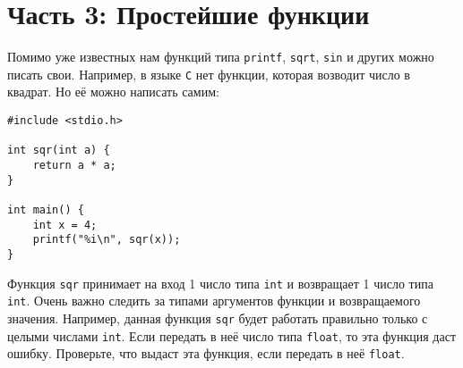 \documentclass{article}
\begin{document}

\section*{Часть 3: Простейшие функции}
Помимо уже известных нам функций типа \texttt{printf}, \texttt{sqrt}, \texttt{sin} и других можно писать свои. Например, в языке \texttt{C} нет функции, которая возводит число в квадрат. Но её можно написать самим:
\begin{lstlisting}
#include <stdio.h>

int sqr(int a) {
    return a * a;
}

int main() {
    int x = 4;
    printf("%i\n", sqr(x));
}
\end{lstlisting}
Функция \texttt{sqr} принимает на вход 1 число типа \texttt{int} и возвращает 1 число типа \texttt{int}. Очень важно следить за типами аргументов функции и возвращаемого значения. Например, данная функция \texttt{sqr} будет работать правильно только с целыми числами \texttt{int}. Если передать в неё число типа \texttt{float}, то эта функция даст ошибку. Проверьте, что выдаст эта функция, если передать в неё \texttt{float}.
\end{document}
